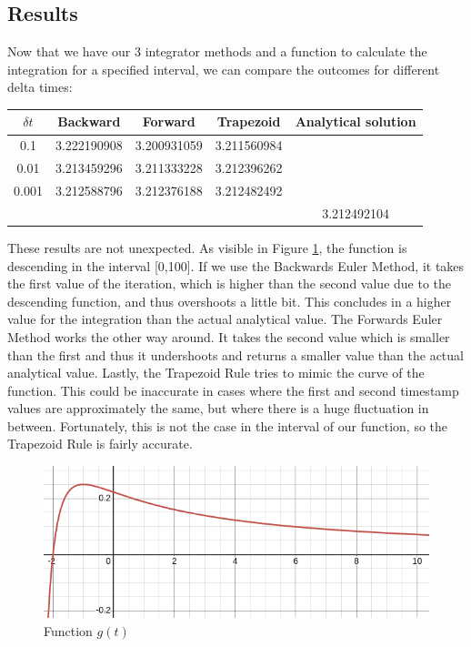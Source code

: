 \documentclass{article}
\begin{document}
\subsection{Results}

Now that we have our 3 integrator methods and a function to calculate the integration for a specified interval, we can compare the outcomes for different delta times:

\begin{center}
    \begin{tabular}{ c | c c c | c}
         $\delta t$ & Backward & Forward & Trapezoid & Analytical solution \\ 
         \hline
     0.1 & 3.222190908 & 3.200931059 & 3.211560984 & \\ 
     0.01 & 3.213459296 & 3.211333228 & 3.212396262 & \\
     0.001 & 3.212588796 & 3.212376188 & 3.212482492 & \\
     \hline
     &&&&3.212492104
    \end{tabular}
\end{center}

These results are not unexpected. As visible in Figure \ref{fig:g_function_plot}, the function is descending in the interval [0,100]. If we use the Backwards Euler Method, it takes the first value of the iteration, which is higher than the second value due to the descending function, and thus overshoots a little bit. This concludes in a higher value for the integration than the actual analytical value. The Forwards Euler Method works the other way around. It takes the second value which is smaller than the first and thus it undershoots and returns a smaller value than the actual analytical value. Lastly, the Trapezoid Rule tries to mimic the curve of the function. This could be inaccurate in cases where the first and second timestamp values are approximately the same, but where there is a huge fluctuation in between. Fortunately, this is not the case in the interval of our function, so the Trapezoid Rule is fairly accurate.

\begin{figure}
    \centering
    \includegraphics[width=0.75\linewidth]{Images/g_function_plot.png}
    \caption{Function $g(t)$}
    \label{fig:g_function_plot}
\end{figure}
\end{document}
